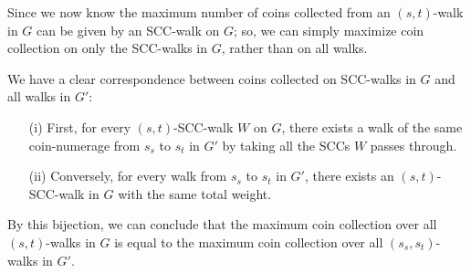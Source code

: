\documentclass{article}
\begin{document}
\begin{solution}
\begin{subproof}[Correctness]
Since we now know the maximum number of coins collected from an \( (s,t) \)-walk in \( G \) can be given by an SCC-walk on \( G \); so, we can simply maximize coin collection on only the SCC-walks in \( G \), rather than on all walks.

We have a clear correspondence between coins collected on SCC-walks in \( G \) and all walks in \( G' \):
\begin{enumerate}
    \item [(i)] First, for every \( (s,t) \)-SCC-walk \( W \) on \( G \), there exists a walk of the same coin-numerage from \( s_s \) to \( s_t \) in \( G' \) by taking all the SCCs \( W \) passes through.
    \item [(ii)] Conversely, for every walk from \( s_s \) to \( s_t \) in \( G' \), there exists an \( (s,t) \)-SCC-walk in \( G \) with the same total weight.
\end{enumerate}

By this bijection, we can conclude that the maximum coin collection over all \( (s,t) \)-walks in \( G \) is equal to the maximum coin collection over all \( (s_s,s_t) \)-walks in \( G' \).
\end{subproof}

\end{solution}
\pagebreak
\end{document}

